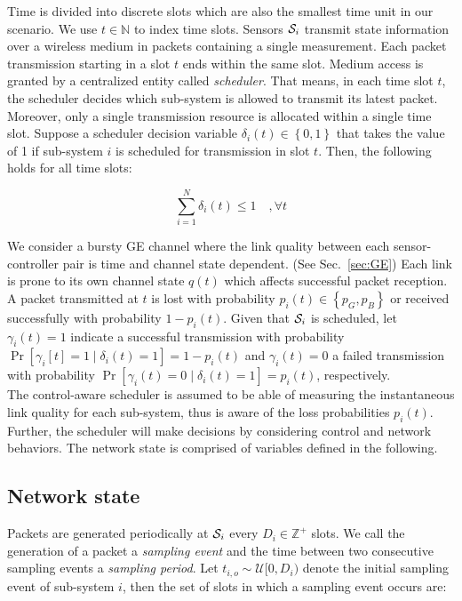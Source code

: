 Time is divided into discrete slots which are also the smallest time unit in our
scenario. We use $t \in \mathbb{N}$ to index time slots. Sensors $\mathcal{S}_i$
transmit state information over a wireless medium in packets containing a single
measurement. Each packet transmission starting in a slot $t$ ends within the
same slot. Medium access is granted by a centralized entity called
\textit{scheduler}. That means, in each time slot $t$, the scheduler decides
which sub-system is allowed to transmit its latest packet. Moreover, only a
single transmission resource is allocated within a single time slot. Suppose a
scheduler decision variable $\delta_i(t) \in \left\{0,1\right\}$ that takes the
value of 1 if sub-system $i$ is scheduled for transmission in slot $t$. Then,
the following holds for all time slots:

\begin{equation}
  \sum_{i=1}^{N}{\delta_i(t) \leq 1 \quad, \forall t}
\end{equation}

We consider a bursty GE channel where the link quality between each
sensor-controller pair is time and channel state dependent. (See
Sec.~{\ref{sec:GE}}) Each link is prone to its own channel state $q(t)$ which
affects successful packet reception. A packet transmitted at $t$ is lost with
probability $p_i(t) \in \left\{p_G,p_B\right\}$ or received successfully with
probability $1-p_i(t)$. Given that $\mathcal{S}_i$ is scheduled, let $\gamma_i(t)=1$
indicate a successful transmission with probability $\Pr[\gamma_i[t]=1 \mid
\delta_i(t)=1] = 1-p_i(t)$ and $\gamma_i(t)=0$ a failed transmission with
probability $\Pr[\gamma_i(t)=0 \mid \delta_i(t)=1] = p_i(t)$, respectively. \\ 
The control-aware scheduler is assumed to be able of measuring the instantaneous
link quality for each sub-system, thus is aware of the loss probabilities
$p_i(t)$. Further, the scheduler will make decisions by considering control and
network behaviors. The network state is comprised of variables defined in the
following.

\subsection{Network state}

Packets are generated periodically at $\mathcal{S}_i$ every $D_i \in \mathbb{Z}^+$
slots. We call the generation of a packet a \textit{sampling event} and the time
between two consecutive sampling events a \textit{sampling period}. Let $t_{i,o}
\sim \mathcal{U}[0, D_i)$ denote the initial sampling event of sub-system $i$,
then the set of slots in which a sampling event occurs are:

